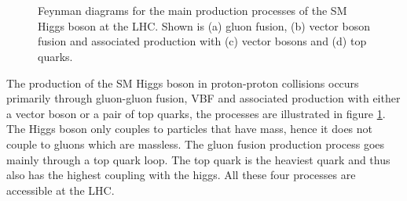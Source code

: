 \begin{figure}[!htb]
 \qquad
{} \\
  \qquad
{} \\
\caption[Feynman diagrams for the main production processes of the SM Higgs
boson at the LHC.]{Feynman diagrams for the main production processes of the \gls{SM} Higgs
boson at the LHC. Shown is (a) gluon fusion, (b) vector boson fusion and
associated production with (c) vector bosons and (d) top quarks.}
\label{FIGURE:Theory_SM_SearchingSMHiggs_SMFeynmanDiagrams}
\end{figure}

The production of the \gls{SM} Higgs boson in proton-proton collisions occurs primarily through gluon-gluon fusion, \gls{VBF} and associated production with either a vector boson or a pair of top quarks, the processes are illustrated in figure \ref{FIGURE:Theory_SM_SearchingSMHiggs_SMFeynmanDiagrams}. The Higgs boson only couples to particles that have mass, hence it does not couple to gluons which are massless. The gluon fusion production process goes mainly through a top quark loop. The top quark is the heaviest quark and thus also has the highest coupling with the higgs. All these four processes are accessible at the \gls{LHC}.

